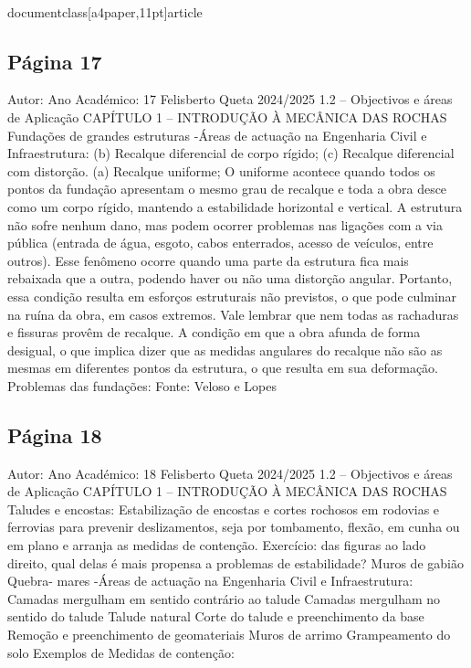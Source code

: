 \\documentclass[a4paper,11pt]{article}
\begin{document}
\subsection*{Página 17}
Autor:
Ano Académico:
17
Felisberto Queta
2024/2025
1.2 – Objectivos e áreas de Aplicação
CAPÍTULO 1 – INTRODUÇÃO À MECÂNICA DAS ROCHAS
Fundações de grandes estruturas
-Áreas de actuação na Engenharia Civil e Infraestrutura:
(b) Recalque diferencial de 
corpo rígido; 
(c) Recalque diferencial com 
distorção. 
(a) Recalque uniforme; 
O uniforme acontece quando todos os 
pontos da fundação apresentam o mesmo 
grau de recalque e toda a obra desce como 
um corpo rígido, mantendo a estabilidade 
horizontal e vertical. A estrutura não sofre 
nenhum dano, mas podem ocorrer problemas 
nas ligações com a via pública (entrada de 
água, esgoto, cabos enterrados, acesso de 
veículos, entre outros).
Esse fenômeno ocorre quando uma 
parte da estrutura fica mais rebaixada 
que a outra, podendo haver ou não uma 
distorção angular. Portanto, essa 
condição resulta em esforços estruturais 
não previstos, o que pode culminar na 
ruína da obra, em casos extremos. Vale 
lembrar que nem todas as rachaduras e 
fissuras provêm de recalque.
A condição em que a obra 
afunda de forma desigual, 
o que implica dizer que as 
medidas angulares do 
recalque não são as 
mesmas em diferentes 
pontos da estrutura, o que 
resulta em sua 
deformação.
Problemas das fundações:
Fonte: Veloso e Lopes



\subsection*{Página 18}
Autor:
Ano Académico:
18
Felisberto Queta
2024/2025
1.2 – Objectivos e áreas de Aplicação
CAPÍTULO 1 – INTRODUÇÃO À MECÂNICA DAS ROCHAS
Taludes e encostas:
Estabilização de encostas e cortes rochosos em rodovias e ferrovias para prevenir
deslizamentos, seja por tombamento, flexão, em cunha ou em plano e arranja as medidas de
contenção.
Exercício: das figuras ao lado direito,
qual delas é mais propensa a problemas
de estabilidade?
Muros
de
gabião
Quebra-
mares
-Áreas de actuação na Engenharia Civil e Infraestrutura:
Camadas
mergulham
em
sentido contrário ao talude
Camadas
mergulham
no
sentido do talude
Talude natural
Corte
do
talude
e
preenchimento da base
Remoção e preenchimento
de geomateriais
Muros
de
arrimo
Grampeamento
do solo
Exemplos
de
Medidas
de
contenção:
\end{document}
